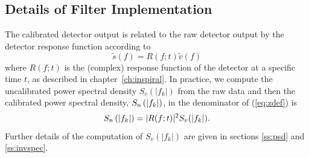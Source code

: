 \subsection{Details of Filter Implementation}
\label{ss:dirtydetails}

The calibrated detector output is related to the raw detector output by the
detector response function according to
\begin{equation}
\tilde{s}(f) = R(f;t) \tilde{v}(f)
\end{equation}
where $R(f;t)$ is the (complex) response function of the detector at a
specific time $t$, as described in chapter~\ref{ch:inspiral}. In practice, we
compute the uncalibrated power spectral density $S_v(|f_k|)$ from the raw data
and then the calibrated power spectral density, $S_n\left(\left|f_{k}\right|\right)$, in the denominator
of (\ref{eq:zdef}) is
\begin{equation}
S_n\left(\left|f_{k}\right|\right) = |R(f;t)|^2 S_v(|f_k|).
\end{equation}
Further details of the computation of $S_v(|f_k|)$ are given in sections
\ref{ss:psd} and \ref{ss:invspec}.

